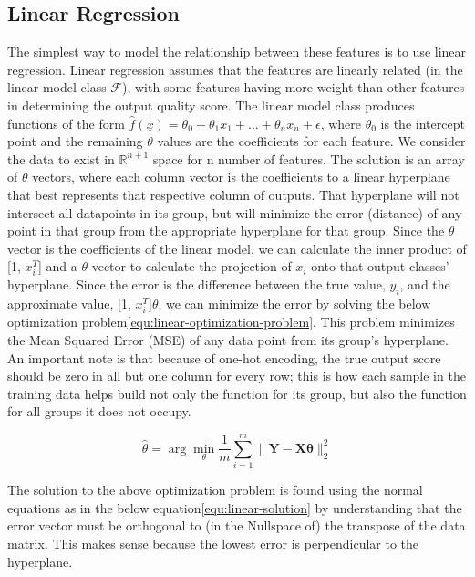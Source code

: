 \documentclass[11pt]{amsart}
\begin{document}
\subsection{Linear Regression}\label{sec:Linear}

The simplest way to model the relationship between these features is to use linear regression. Linear regression assumes that 
the features are linearly related (in the linear model class $\mathcal{F}$), with some features having more weight than other features 
in determining the output quality score. The linear model class produces functions of the form 
$\hat{f}(\underline{x}) = \theta_0 + \theta_1 x_1 + \dots + \theta_n x_n + \epsilon$, where $\theta_0$ is the intercept point and the 
remaining $\theta$ values are the coefficients for each feature. We consider the data to exist in 
$\mathbb{R}^{n+1}$ space for n number of features. The solution is an array of $\theta$ vectors, where each column vector is the coefficients 
to a linear hyperplane that best represents that respective column of outputs\cite{stranglinalg}. That hyperplane will not intersect all datapoints in its group, 
but will minimize the error (distance) of any point in that group from the appropriate hyperplane for that group. Since the $\theta$ vector 
is the coefficients of the linear model, we can calculate the inner product of [1, $x_i^T$] and a $\theta$ vector to calculate the projection of
$x_i$ onto that output classes' hyperplane. Since the error is the difference between the true value, $y_i$, and the approximate value, 
[1, $x_i^T$]$\theta$, we can minimize the error by solving the below optimization problem\eqref{equ:linear-optimization-problem}. This problem 
minimizes the Mean Squared Error (MSE) of any data point from its group's hyperplane. An important note is that because of 
one-hot encoding, the true output score should be zero in all but one column for every row; this is how each sample in the training data helps 
build not only the function for its group, but also the function for all groups it does not occupy.

\begin{equation}
    \hat{\theta} = \arg\min_{\theta} \frac{1}{m} \sum_{i=1}^{m} \| \boldsymbol{Y} - \boldsymbol{X}\boldsymbol\theta \|^2_2
    \label{equ:linear-optimization-problem}
\end{equation}

The solution to the above optimization problem is found using the normal equations as in the below equation\eqref{equ:linear-solution} 
by understanding that the error vector must be orthogonal to (in the Nullspace of) the transpose of the data matrix\cite{stranglinalg}. 
This makes sense because the lowest error is perpendicular to the hyperplane. 
\end{document}
